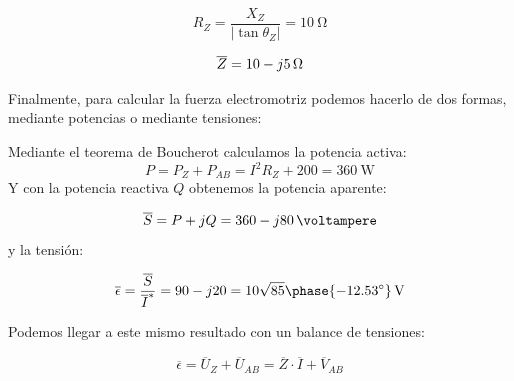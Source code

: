 \[
  R_Z = \frac{X_Z}{|\tan\theta_Z|} = \qty{10}{\ohm}
\]

\[
  \overline{Z} =  \qty[parse-numbers=false]{10 - j5}{\ohm}
\]

Finalmente, para calcular la fuerza electromotriz podemos hacerlo de dos formas, mediante potencias o mediante tensiones:

Mediante el teorema de Boucherot calculamos la potencia activa:
\[
P = P_Z + P_{AB} = I^2 R_Z + 200 = \qty{360}{\watt}
\]
Y con la potencia reactiva $Q$ obtenemos la potencia aparente:

\[
  \overline{S} = P + jQ = \qty[parse-numbers=false]{360 -j80}{\voltampere}
\]
y la tensión:

\[
  \overline{\epsilon} = \frac{\overline{S}}{\overline{I}^*} = 90 - j20 = \qty[parse-numbers=false]{10\sqrt{85}\phase{\ang{-12.53}}}{\volt}
\]

Podemos llegar a este mismo resultado con un balance de tensiones:

\[
  \overline{\epsilon} = \overline{U}_Z + \overline{U}_{AB} = \overline{Z} \cdot \overline{I} + \overline{V}_{AB}
\]

